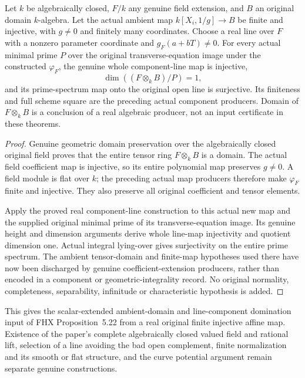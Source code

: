 \begin{theorem}
\label{algebra:scalar-line-component-domination}
\leanok
{}
Let $k$ be algebraically closed, $F/k$ any genuine field extension,
and $B$ an original domain $k$-algebra. Let the actual ambient map
$k[X_i,1/g]\to B$ be finite and injective, with $g\ne0$ and finitely
many coordinates. Choose a real line over $F$ with a nonzero parameter
coordinate and $g_F(a+bT)\ne0$. For every actual minimal prime $P$ over
the original transverse-equation image under the constructed
$\varphi_F$, the genuine whole component-line map is injective,
\[
 \dim((F\otimes_k B)/P)=1,
\]
and its prime-spectrum map onto the original open line is surjective.
Its finiteness and full scheme square are the preceding actual component
producers. Domain of $F\otimes_k B$ is a conclusion of a real algebraic
producer, not an input certificate in these theorems.
\end{theorem}
\begin{proof}
Genuine geometric domain preservation over the algebraically closed
original field proves that the entire tensor ring $F\otimes_k B$ is a
domain. The actual field coefficient map is injective, so its entire
polynomial map preserves $g\ne0$. A field module is flat over $k$;
the preceding actual map producers therefore make $\varphi_F$ finite
and injective. They also preserve all original coefficient and tensor
elements.

Apply the proved real component-line construction to this actual new
map and the supplied original minimal prime of its transverse-equation
image. Its genuine height and dimension arguments derive whole line-map
injectivity and quotient dimension one. Actual integral lying-over
gives surjectivity on the entire prime spectrum. The ambient tensor-domain
and finite-map hypotheses used there have now been discharged by genuine
coefficient-extension producers, rather than encoded in a component or
geometric-integrality record. No original normality, completeness,
separability, infinitude or characteristic hypothesis is added.
\end{proof}

This gives the scalar-extended ambient-domain and line-component domination
input of FHX Proposition~5.22 from a real original finite injective affine
map. Existence of the paper's complete algebraically closed valued field
and rational lift, selection of a line avoiding the bad open complement,
finite normalization and its smooth or flat structure, and the curve
potential argument remain separate genuine constructions.
